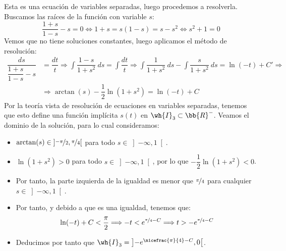 \begin{ejercicio}
    Esta es una ecuación de variables separadas, luego procedemos a resolverla. Buscamos las raíces de la función con variable $s$:
    \begin{equation*}
        \dfrac{1+s}{1-s} - s = 0 \Longleftrightarrow 1+s = s(1-s) = s-s^2 \Longleftrightarrow s^2+1=0
    \end{equation*}
    Vemos que no tiene soluciones constantes, luego aplicamos el método de resolución:
    \begin{align*}
        \dfrac{ds}{\dfrac{1+s}{1-s} - s} &= \dfrac{dt}{t} \Longrightarrow \int \dfrac{1-s}{1+s^2} ~ds = \int \dfrac{dt}{t} \Longrightarrow \int \dfrac{1}{1+s^2} ~ds - \int \dfrac{s}{1+s^2} ~ds = \ln(-t)+C'
        \Longrightarrow \\ &\Longrightarrow \arctan(s) - \dfrac{1}{2}\ln(1+s^2) = \ln(-t)+C
    \end{align*}
    Por la teoría vista de resolución de ecuaciones en variables separadas, tenemos que esto define una función implícita $s(t)$ en $\wh{I}_3\subset \bb{R}^-$. Veamos el dominio de la solución, para lo cual consideramos:
    \begin{itemize}
        \item $\arctan(s)\in \left]\nicefrac{-\pi}{2},\nicefrac{\pi}{4}\right[$ para todo $s\in \left]-\infty,1\right[$.
        \item $\ln(1+s^2)>0$ para todo $s\in \left]-\infty,1\right[$, por lo que $-\dfrac{1}{2}\ln(1+s^2)<0$.
        \item Por tanto, la parte izquierda de la igualdad es menor que $\nicefrac{\pi}{4}$ para cualquier $s\in \left]-\infty,1\right[$.
        \item Por tanto, y debido a que es una igualdad, tenemos que:
        \begin{equation*}
            \ln(-t)+C<\frac{\pi}{2} \Longrightarrow -t<e^{\nicefrac{\pi}{4}-C} \Longrightarrow t>-e^{\nicefrac{\pi}{4}-C}
        \end{equation*}
        \item Deducimos por tanto que $\wh{I}_3=\left]-e^{\nicefrac{\pi}{4}-C},0\right[$.
    \end{itemize}


\end{ejercicio}
